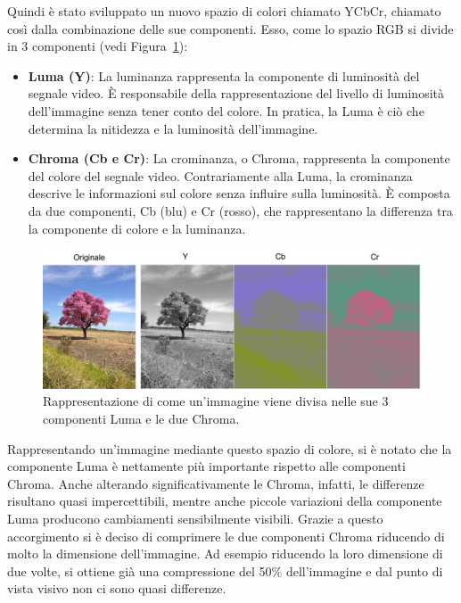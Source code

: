 \documentclass[a4paper,12pt, oneside]{article}
\begin{document}
Quindi è stato sviluppato un nuovo spazio di colori chiamato YCbCr, chiamato così dalla combinazione
delle sue componenti. Esso, come lo spazio RGB si divide in 3 componenti (vedi Figura~\ref{fig:n_YCbCr}):

\begin{itemize}
    \item \textbf{Luma (Y)}: La luminanza rappresenta la componente di luminosità del segnale video.
    È responsabile della rappresentazione del livello di luminosità dell'immagine senza tener conto
    del colore. In pratica, la Luma è ciò che determina la nitidezza e la luminosità dell'immagine.
    \item \textbf{Chroma (Cb e Cr)}: La crominanza, o Chroma, rappresenta la componente del colore
    del segnale video. Contrariamente alla Luma, la crominanza descrive le informazioni sul colore
    senza influire sulla luminosità. È composta da due componenti, Cb (blu) e Cr (rosso), che
    rappresentano la differenza tra la componente di colore e la luminanza.
\end{itemize}

\begin{figure}[h]
    \centering
    \includegraphics[width=1\textwidth]{images/n-YCbCr.png}
    \caption{Rappresentazione di come un'immagine viene divisa nelle sue 3 componenti Luma e le due
    Chroma.}
    \label{fig:n_YCbCr}
\end{figure}

Rappresentando un'immagine mediante questo spazio di colore, si è notato che la componente Luma è
nettamente più importante rispetto alle componenti Chroma. Anche alterando significativamente le
Chroma, infatti, le differenze risultano quasi impercettibili, mentre anche piccole variazioni
della componente Luma producono cambiamenti sensibilmente visibili.
Grazie a questo accorgimento si è deciso di comprimere le due componenti Chroma riducendo di molto
la dimensione dell'immagine. Ad esempio riducendo la loro dimensione di due volte, si ottiene già
una compressione del 50\% dell'immagine e dal punto di vista visivo non ci sono quasi differenze.
\end{document}
